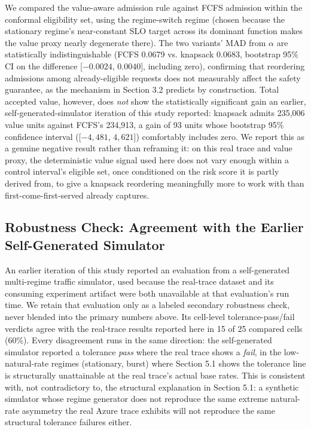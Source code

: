 \documentclass[11pt,letterpaper]{article}
\begin{document}
We compared the value-aware admission rule against FCFS admission within the conformal eligibility set, using the regime-switch regime (chosen because the stationary regime's near-constant SLO target across its dominant function makes the value proxy nearly degenerate there). The two variants' MAD from $\alpha$ are statistically indistinguishable (FCFS 0.0679 vs. knapsack 0.0683, bootstrap 95\% CI on the difference [$-0.0024$, $0.0040$], including zero), confirming that reordering admissions among already-eligible requests does not measurably affect the safety guarantee, as the mechanism in Section 3.2 predicts by construction. Total accepted value, however, does \textit{not} show the statistically significant gain an earlier, self-generated-simulator iteration of this study reported: knapsack admits 235,006 value units against FCFS's 234,913, a gain of 93 units whose bootstrap 95\% confidence interval ([$-4{,}481$, $4{,}621$]) comfortably includes zero. We report this as a genuine negative result rather than reframing it: on this real trace and value proxy, the deterministic value signal used here does not vary enough within a control interval's eligible set, once conditioned on the risk score it is partly derived from, to give a knapsack reordering meaningfully more to work with than first-come-first-served already captures.

\subsection{Robustness Check: Agreement with the Earlier Self-Generated Simulator}

An earlier iteration of this study reported an evaluation from a self-generated multi-regime traffic simulator, used because the real-trace dataset and its consuming experiment artifact were both unavailable at that evaluation's run time. We retain that evaluation only as a labeled secondary robustness check, never blended into the primary numbers above. Its cell-level tolerance-pass/fail verdicts agree with the real-trace results reported here in 15 of 25 compared cells (60\%). Every disagreement runs in the same direction: the self-generated simulator reported a tolerance \textit{pass} where the real trace shows a \textit{fail}, in the low-natural-rate regimes (stationary, burst) where Section 5.1 shows the tolerance line is structurally unattainable at the real trace's actual base rates. This is consistent with, not contradictory to, the structural explanation in Section 5.1: a synthetic simulator whose regime generator does not reproduce the same extreme natural-rate asymmetry the real Azure trace exhibits will not reproduce the same structural tolerance failures either.
\end{document}
